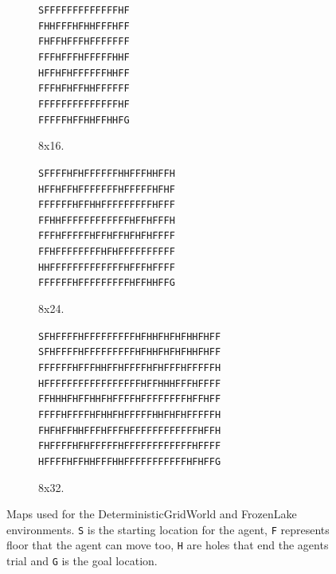 \begin{figure}
        \begin{subfigure}[b]{0.3\textwidth}
            \centering
            \texttt{SFFFFFFFFFFFFFHF} \\
            \texttt{FHHFFFHFHHFFFHFF} \\
            \texttt{FHFFHFFFHFFFFFFF} \\
            \texttt{FFFHFFFHFFFFFHHF} \\
            \texttt{HFFHFHFFFFFFHHFF} \\
            \texttt{FFFHFHFFHHFFFFFF} \\
            \texttt{FFFFFFFFFFFFFFHF} \\
            \texttt{FFFFFHFFHHFFHHFG}
            \caption{8x16.}
        \end{subfigure}
        \begin{subfigure}[b]{0.5\textwidth}
            \centering
            \texttt{SFFFFHFHFFFFFFHHFFFHHFFH} \\
            \texttt{HFFHFFHFFFFFFFHFFFFFHFHF} \\
            \texttt{FFFFFFHFFHHFFFFFFFFFHFFF} \\
            \texttt{FFHHFFFFFFFFFFFFHFFHFFFH} \\
            \texttt{FFFHFFFFFHFFHFFHFHFHFFFF} \\
            \texttt{FFHFFFFFFFFHFHFFFFFFFFFF} \\
            \texttt{HHFFFFFFFFFFFFFHFFFHFFFF} \\
            \texttt{FFFFFFHFFFFFFFFFHFFHHFFG}
            \caption{8x24.}
        \end{subfigure}
        \begin{subfigure}[b]{0.5\textwidth}
            \centering
            \texttt{SFHFFFFHFFFFFFFFFHFHHFHFHFHHFHFF} \\
            \texttt{SFHFFFFHFFFFFFFFFHFHHFHFHFHHFHFF} \\
            \texttt{FFFFFFHFFFHHFFHFFFFHFHFFFHFFFFFH} \\
            \texttt{HFFFFFFFFFFFFFFFFFHFFHHHFFFHFFFF} \\
            \texttt{FFHHHFHFFHHFHFFFFHFFFFFFFFHFFHFF} \\
            \texttt{FFFFHFFFFHFHHFHFFFFFHHFHFHFFFFFH} \\
            \texttt{FHFHFFHHFFFHFFFHFFFFFFFFFFFFHFFH} \\
            \texttt{FHFFFFHFHFFFFFHFFFFFFFFFFFFHFFFF} \\
            \texttt{HFFFFHFFHHFFFHHFFFFFFFFFFFHFHFFG}
            \caption{8x32.}
        \end{subfigure}
        \caption[Maps used for the DeterministicGridWorld and FrozenLake environment.]{Maps used for the DeterministicGridWorld and FrozenLake environments. \texttt{S} is the starting location for the agent, \texttt{F} represents floor that the agent can move too, \texttt{H} are holes that end the agents trial and \texttt{G} is the goal location.}
        \label{appfig:fl_maps}
    \end{figure}
